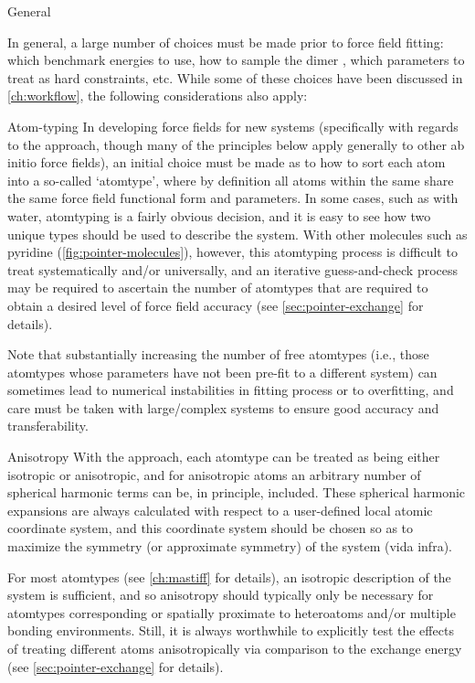 \begin{subsection}{General}

In general, a large number of choices must be made prior to force field
fitting: which benchmark energies to use, how to sample the dimer \pes, which
parameters to treat as hard constraints, etc. While some of these choices have
been discussed in \cref{ch:workflow}, the following considerations also apply:

\begin{paragraph}{Atom-typing}
In developing force fields for new systems (specifically with regards to the \mastiff approach, though
many of the principles below apply generally to other ab initio force fields),
an initial choice must be made as to how to sort each atom into a so-called
`atomtype', where by definition all atoms within the same \atomtype share the
same force field functional form and parameters. In some cases, such as with
water, atomtyping is a fairly obvious decision, and it is easy to see how two
unique types should be used to describe the system. With other molecules
such as pyridine (\cref{fig:pointer-molecules}), however, this
atomtyping process is difficult to treat systematically and/or universally, and an iterative
guess-and-check process may be required to ascertain the number of atomtypes
that are required to obtain a desired level of force field accuracy (see
\cref{sec:pointer-exchange} for details).

Note that substantially increasing the number of free atomtypes (i.e., those
atomtypes whose parameters have not been pre-fit to a different system) 
can sometimes lead to numerical instabilities in fitting process or to
overfitting,\cite{Hawkins2004} and care must be taken with large/complex
systems to ensure good accuracy and transferability. 
\end{paragraph}

\begin{paragraph}{Anisotropy}
With the \mastiff approach, each atomtype can be treated as being either
isotropic or anisotropic, and for anisotropic atoms an arbitrary number of
spherical harmonic terms can be, in principle, included. These spherical
harmonic expansions are always calculated with respect to a user-defined local
atomic coordinate system, and this coordinate system should be chosen so as to
maximize the symmetry (or approximate symmetry) of the system (vida infra).

For most atomtypes (see \cref{ch:mastiff} for details), an isotropic description of the system is
sufficient, and so anisotropy should typically only be necessary for
atomtypes corresponding or spatially proximate to heteroatoms and/or multiple
bonding environments. Still, it is always worthwhile to explicitly test the effects of treating
different atoms anisotropically via comparison to the \sapt exchange energy
(see \cref{sec:pointer-exchange} for details). 


\end{paragraph}
\end{subsection}
